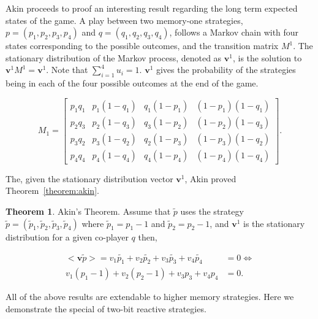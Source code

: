\documentclass{article}
\theoremstyle{definition}
\newtheorem{theorem}{Theorem}[section]
\begin{document}
Akin proceeds to proof an interesting result regarding the long term expected
states of the game. A play between two memory-one strategies, \(p = (p_1, p_2,
p_3, p_4)\) and \(q = (q_1, q_2, q_3, q_4)\), follows a Markov chain with four
states corresponding to the possible outcomes, and the transition matrix
\(M^{1}\). The stationary distribution of the Markov process, denoted as
\(\mathbf{v}^{1}\), is the solution to \(\mathbf{v}^{1} M^{1} =
\mathbf{v}^{1}\). Note that \(\sum_{i=1}^{4} u_{i} = 1\). \(\mathbf{v}^{1}\) gives the probability of the strategies
being in each of the four possible outcomes at the end of the game.

\begin{equation}
\displaystyle M_1 = \left[\begin{matrix}p_{1} q_{1} & p_{1} \left(1 - q_{1}\right) & q_{1} \left(1 - p_{1}\right) & \left(1 - p_{1}\right) \left(1 - q_{1}\right)\\
  p_{2} q_{3} & p_{2} \left(1 - q_{3}\right) & q_{3} \left(1 - p_{2}\right) & \left(1 - p_{2}\right) \left(1 - q_{3}\right)\\
  p_{3} q_{2} & p_{3} \left(1 - q_{2}\right) & q_{2} \left(1 - p_{3}\right) & \left(1 - p_{3}\right) \left(1 - q_{2}\right)\\
  p_{4} q_{4} & p_{4} \left(1 - q_{4}\right) & q_{4} \left(1 - p_{4}\right) & \left(1 - p_{4}\right) \left(1 - q_{4}\right)\end{matrix}\right].
\end{equation}

The, given the stationary distribution vector \(\mathbf{v}^{1}\), Akin proved
Theorem~\ref{theorem:akin}.

\begin{theorem}{Akin's Theorem.}
  Assume that \(\tilde{p}\) uses the strategy \(\tilde{p} = (\tilde{p}_1, \tilde{p}_2,
  \tilde{p}_3, \tilde{p}_4)\) where \(\tilde{p}_1 = p_1 - 1\) and \(\tilde{p}_2 = p_2 - 1\), and
  \(\mathbf{v}^{1}\) is the stationary distribution for a given co-player \(q\) then,

  \begin{align}
    <\mathbf{v} \tilde{p}> = v_1 \tilde{p_1} + v_2 \tilde{p_2} + v_3 \tilde{p_3} + v_4 \tilde{p_4} & = 0 \Leftrightarrow \\
    v_1 (p_1 - 1) + v_2 (p_2 - 1) + v_3 p_3 + v_4 p_4 & = 0.
  \end{align}
\end{theorem}\label{theorem:akin}

All of the above results are extendable to higher memory strategies. Here we
demonstrate the special of two-bit reactive strategies.
\end{document}
